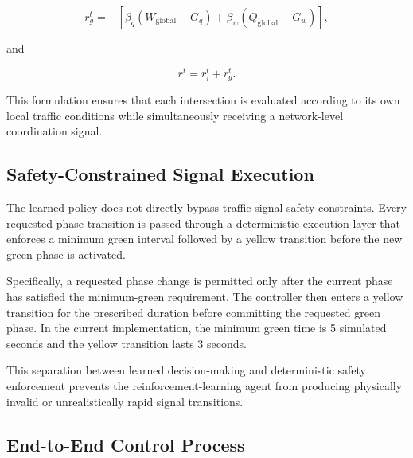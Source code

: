 \documentclass[3p,times]{elsarticle}
\theoremstyle{plain}
\theoremstyle{definition}
\begin{document}
\begin{equation}
r_g^t = -\left[\beta_q(W_{\mathrm{global}} - G_q) +
\beta_w(Q_{\mathrm{global}} - G_w)\right],
\end{equation}

and

\begin{equation}
r^t = r_i^t + r_g^t.
\end{equation}

This formulation ensures that each intersection is evaluated according
to its own local traffic conditions while simultaneously receiving a
network-level coordination signal.


\subsection{Safety-Constrained Signal Execution}\label{subsec3-9}

The learned policy does not directly bypass traffic-signal safety
constraints. Every requested phase transition is passed through a
deterministic execution layer that enforces a minimum green interval
followed by a yellow transition before the new green phase is
activated.

Specifically, a requested phase change is permitted only after the
current phase has satisfied the minimum-green requirement. The
controller then enters a yellow transition for the prescribed duration
before committing the requested green phase. In the current
implementation, the minimum green time is 5 simulated seconds and the
yellow transition lasts 3 seconds.

This separation between learned decision-making and
deterministic safety enforcement prevents the reinforcement-learning
agent from producing physically invalid or unrealistically rapid
signal transitions.


\subsection{End-to-End Control Process}\label{subsec3-10}
\end{document}
